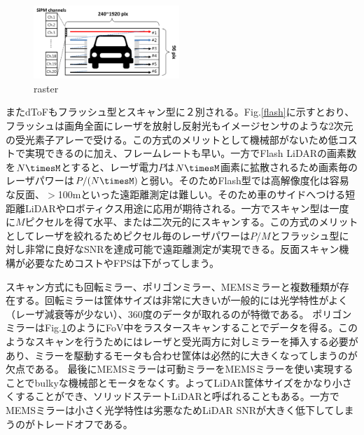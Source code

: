 \documentclass[letterpaper, 10 pt, conference]{ieeeconf}  %
\begin{document}
\begin{figure}[!t]
\centering
 \includegraphics[width=0.49\textwidth]{figs/raster.png}
  \caption{raster}
\label{raster}
\end{figure}

またdToFもフラッシュ型\cite{ximenes2018256, padmanabhan20217, lindner2018252}とスキャン型に２別される。Fig.\ref{flash}に示すとおり、フラッシュは画角全面にレーザを放射し反射光もイメージセンサのような2次元の受光素子アレーで受ける。この方式のメリットとして機械部がないため低コストで実現できるのに加え、フレームレートも早い。一方でFlash LiDARの画素数を$N\timesM$とすると、レーザ電力$P$は$N\timesM$画素に拡散されるため画素毎のレーザパワーは$P/(N\timesM)$と弱い。そのためFlash型では高解像度化は容易な反面、$>$100mといった遠距離測定は難しい。そのため車のサイドへつける短距離LiDARやロボティクス用途に応用が期待される。一方でスキャン型は一度に$M$ピクセルを得て水平、または二次元的にスキャンする。この方式のメリットとしてレーザを絞れるためピクセル毎のレーザパワーは$P/M$とフラッシュ型に対し非常に良好なSNRを達成可能で遠距離測定が実現できる。反面スキャン機構が必要なためコストやFPSは下がってしまう。

スキャン方式にも回転ミラー\cite{velodyne,ouster}、ポリゴンミラー\cite{niclass2012100,yoshioka201820,kondo2020automotive}、MEMSミラー\cite{ito2013system,akita2017imager, kumagai2021189x600}と複数種類が存在する。回転ミラーは筐体サイズは非常に大きいが一般的には光学特性がよく（レーザ減衰等が少ない）、360度のデータが取れるのが特徴である。
ポリゴンミラーはFig.\ref{raster}のようにFoV中をラスタースキャンすることでデータを得る。このようなスキャンを行うためにはレーザと受光両方に対しミラーを挿入する必要があり、ミラーを駆動するモータも合わせ筐体は必然的に大きくなってしまうのが欠点である。
最後にMEMSミラーは可動ミラーをMEMSミラーを使い実現することでbulkyな機械部とモータをなくす。よってLiDAR筐体サイズをかなり小さくすることができ、ソリッドステートLiDARと呼ばれることもある。一方でMEMSミラーは小さく光学特性は劣悪なためLiDAR SNRが大きく低下してしまうのがトレードオフである。

\end{document}
